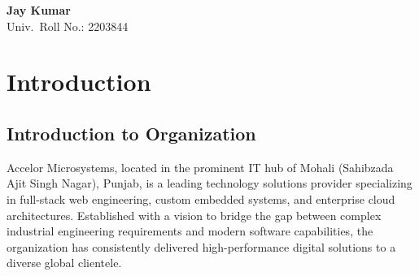 \documentclass[12pt, a4paper, oneside]{report}
\begin{document}
\vspace{2.5cm}

\begin{flushright}
\textbf{Jay Kumar}\\
Univ.\ Roll No.: 2203844 {\hspace{3.5cm}}
\end{flushright}

\newpage
{}
\listoffigures

\newpage
{}
\listoftables

\newpage
{}
\tableofcontents

\newpage
{}
\setcounter{page}{1}

\chapter{Introduction}

\section{Introduction to Organization}

Accelor Microsystems, located in the prominent IT hub of Mohali (Sahibzada Ajit Singh Nagar), Punjab, is a leading technology solutions provider specializing in full-stack web engineering, custom embedded systems, and enterprise cloud architectures. Established with a vision to bridge the gap between complex industrial engineering requirements and modern software capabilities, the organization has consistently delivered high-performance digital solutions to a diverse global clientele. 
\end{document}
